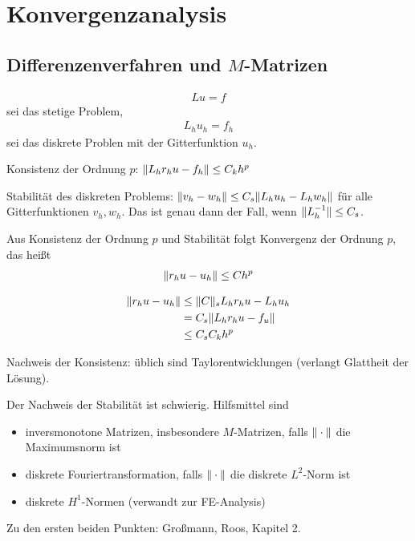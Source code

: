 \section{Konvergenzanalysis}
\subsection{Differenzenverfahren und $M$-Matrizen}
\begin{align*}
  L u = f
\end{align*}
sei das stetige Problem, 
\begin{align*}
  L_h u_h = f_h 
\end{align*}
sei das diskrete Problen mit der Gitterfunktion $u_h$.

Konsistenz der Ordnung $p$: $\|L_h r_h u -f_h\| \leq C_k h^p$

Stabilität des diskreten Problems: $\|v_h - w_h\| \leq C_s \|L_h u_h - L_h w_h\|$ für alle Gitterfunktionen $v_h, w_h$. Das ist genau dann der Fall, wenn $\|L_h^{-1}\| \leq C_s$.

Aus Konsistenz der Ordnung $p$ und Stabilität folgt Konvergenz der Ordnung $p$, das heißt
\begin{align*}
  \|r_h u - u_h\| \leq Ch^p
\end{align*}
\begin{beweis}
  \begin{align*}
    \|r_h u - u_h\| &\leq \|C\|_s{L_h r_h u - L_h u_h} \\
&= C_s \|L_h r_h u - f_u\| \\
&\leq C_s C_k h^p
  \end{align*}
\end{beweis}

Nachweis der Konsistenz: üblich sind Taylorentwicklungen (verlangt Glattheit der Lösung).

Der Nachweis der Stabilität ist schwierig. Hilfsmittel sind 
\begin{itemize}
\item inversmonotone Matrizen, insbesondere $M$-Matrizen, falls $\|\cdot\|$ die Maximumsnorm ist
\item diskrete Fouriertransformation, falls $\|\cdot\|$ die diskrete $L^2$-Norm ist
\item diskrete $H^1$-Normen (verwandt zur FE-Analysis)
\end{itemize}
Zu den ersten beiden Punkten: Großmann, Roos, Kapitel 2.

